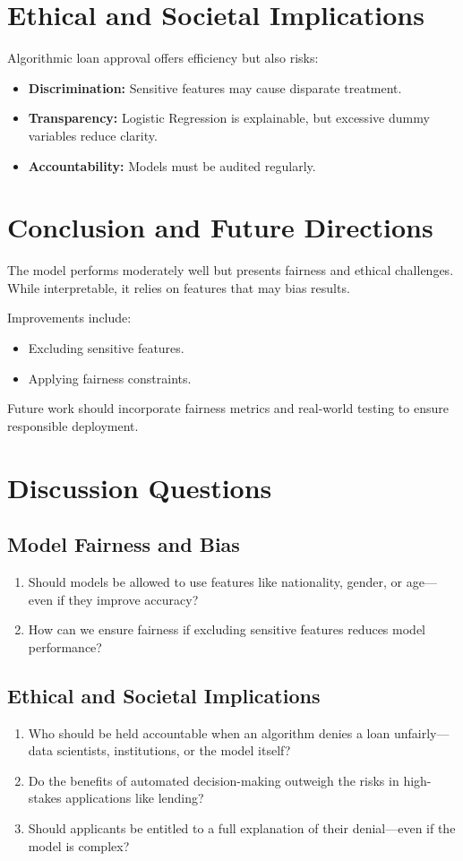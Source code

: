 \documentclass[12pt]{article}
\begin{document}
	\section{Ethical and Societal Implications}
	Algorithmic loan approval offers efficiency but also risks:
	\begin{itemize}
		\item \textbf{Discrimination:} Sensitive features may cause disparate treatment.
		\item \textbf{Transparency:} Logistic Regression is explainable, but excessive dummy variables reduce clarity.
		\item \textbf{Accountability:} Models must be audited regularly.
	\end{itemize}
	
	\section{Conclusion and Future Directions}
	The model performs moderately well but presents fairness and ethical challenges. While interpretable, it relies on features that may bias results. 
	
	Improvements include:
	\begin{itemize}
		\item Excluding sensitive features.
		\item Applying fairness constraints.
	\end{itemize}
	
	Future work should incorporate fairness metrics and real-world testing to ensure responsible deployment.
	
	\section{Discussion Questions}
	
	\subsection*{Model Fairness and Bias}
	\begin{enumerate}
		\item Should models be allowed to use features like nationality, gender, or age—even if they improve accuracy?
		\item How can we ensure fairness if excluding sensitive features reduces model performance?
	\end{enumerate}
	
	\subsection*{Ethical and Societal Implications}
	\begin{enumerate}
		\item Who should be held accountable when an algorithm denies a loan unfairly—data scientists, institutions, or the model itself?
		\item Do the benefits of automated decision-making outweigh the risks in high-stakes applications like lending?
		\item Should applicants be entitled to a full explanation of their denial—even if the model is complex?
	\end{enumerate}
	
\end{document}
